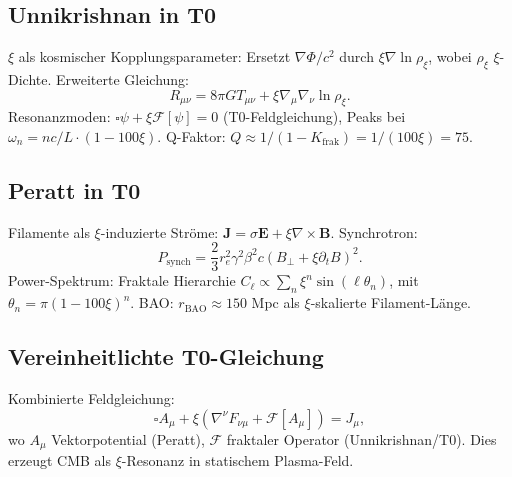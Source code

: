 	\subsection{Unnikrishnan in T0}
	$\xi$ als kosmischer Kopplungsparameter: Ersetzt $\nabla \Phi / c^2$ durch $\xi \nabla \ln \rho_\xi$, wobei $\rho_\xi$ $\xi$-Dichte. Erweiterte Gleichung:
	\begin{equation}
		R_{\mu\nu} = 8\pi G T_{\mu\nu} + \xi \nabla_\mu \nabla_\nu \ln \rho_\xi.
	\end{equation}
	Resonanzmoden: $\square \psi + \xi \mathcal{F}[\psi] = 0$ (T0-Feldgleichung), Peaks bei $\omega_n = n c / L \cdot (1 - 100 \xi)$. Q-Faktor: $Q \approx 1 / (1 - K_{\text{frak}}) = 1/(100\xi) = 75$.
	\subsection{Peratt in T0}
	Filamente als $\xi$-induzierte Ströme: $\mathbf{J} = \sigma \mathbf{E} + \xi \nabla \times \mathbf{B}$. Synchrotron:
	\begin{equation}
		P_{\text{synch}} = \frac{2}{3} r_e^2 \gamma^2 \beta^2 c (B_\perp + \xi \partial_t B)^2.
	\end{equation}
	Power-Spektrum: Fraktale Hierarchie $C_\ell \propto \sum_n \xi^n \sin(\ell \theta_n)$, mit $\theta_n = \pi (1 - 100 \xi)^n$. BAO: $r_{\text{BAO}} \approx 150$ Mpc als $\xi$-skalierte Filament-Länge.
	\subsection{Vereinheitlichte T0-Gleichung}
	Kombinierte Feldgleichung:
	\begin{equation}
		\square A_\mu + \xi \left( \nabla^\nu F_{\nu\mu} + \mathcal{F}[A_\mu] \right) = J_\mu,
	\end{equation}
	wo $A_\mu$ Vektorpotential (Peratt), $\mathcal{F}$ fraktaler Operator (Unnikrishnan/T0). Dies erzeugt CMB als $\xi$-Resonanz in statischem Plasma-Feld.
